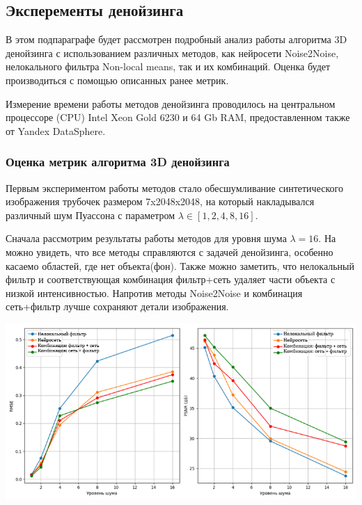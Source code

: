 \subsection{Эксперементы денойзинга}
\par В этом подпараграфе будет рассмотрен подробный анализ работы алгоритма 3D денойзинга с использованием различных методов, как нейросети Noise2Noise, нелокального фильтра Non-local means, так и их комбинаций. Оценка будет производиться с помощью описанных ранее метрик. 
\par Измерение времени работы методов денойзинга проводилось на центральном процессоре (CPU) Intel Xeon Gold 6230 и 64 Gb RAM, предоставленном также от Yandex DataSphere. 
\subsubsection{Оценка метрик алгоритма 3D денойзинга}
\par Первым экспериментом работы методов стало обесшумливание синтетического изображения трубочек размером 7x2048x2048, на который накладывался различный шум Пуассона с параметром $\lambda \in [1, 2, 4, 8, 16]$.
\par Сначала рассмотрим результаты работы методов для уровня шума $\lambda=16$. На  можно увидеть, что все методы справляются с задачей денойзинга, особенно касаемо областей, где нет объекта(фон). Также можно заметить, что нелокальный фильтр и соответствующая комбинация фильтр+сеть удаляет части объекта с низкой интенсивностью. Напротив методы Noise2Noise и комбинация сеть+фильтр лучше сохраняют детали изображения.  
\begin{minipage}{\textwidth}
	\centering
	\vspace{\mfloatsep} %
	\includegraphics[keepaspectratio=true,scale=0.67] {my_folder/images/denoising/metrics_noise.png}
	\label{fig:synthetic-denoise-16}  
	\vspace{\mfloatsep} %
\end{minipage}
